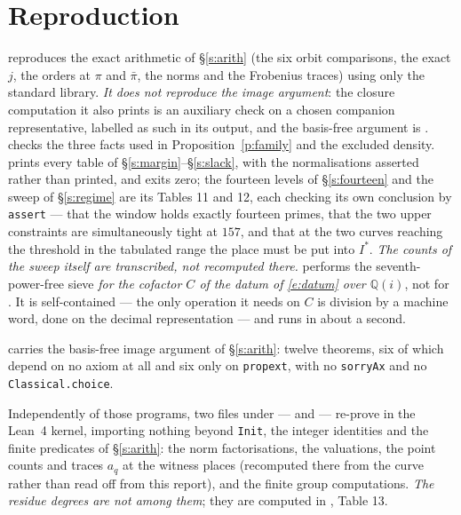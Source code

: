 \documentclass[11pt]{article}
\theoremstyle{plain}
\theoremstyle{definition}
\begin{document}
\section{Reproduction}\label{s:repro}

 reproduces the exact arithmetic of \S\ref{s:arith}
(the six orbit comparisons, the exact $j$, the orders at $\pi$ and $\bar\pi$, the
norms and the Frobenius traces) using only the standard library.  \emph{It does not
reproduce the image argument}: the closure computation it also prints is an auxiliary
check on a chosen companion representative, labelled as such in its output, and the
basis-free argument is .   checks the three facts used in
Proposition~\ref{p:family} and the excluded density.
 prints every table of
\S\ref{s:margin}--\S\ref{s:slack}, with the normalisations asserted rather than
printed, and exits zero; the fourteen levels of \S\ref{s:fourteen} and the sweep of
\S\ref{s:regime} are its Tables 11 and 12, each checking its own conclusion by
\texttt{assert} --- that the window holds exactly fourteen primes, that the two upper
constraints are simultaneously tight at $157$, and that at the two curves reaching the
threshold in the tabulated range the place must be put into $I^{*}$.  \emph{The counts
of the sweep itself are transcribed, not recomputed there.}   performs the seventh-power-free sieve
\emph{for the cofactor $C$ of the datum of \eqref{e:datum} over $\mathbb{Q}(i)$}, not
for \cite{First}.  It is
self-contained --- the only operation it needs on $C$ is division by a machine word,
done on the decimal representation --- and runs in about a second.

 carries the basis-free image argument of
\S\ref{s:arith}: twelve theorems, six of which depend on no axiom at all and six only
on \texttt{propext}, with no \texttt{sorryAx} and no \texttt{Classical.choice}.

Independently of those programs, two files under  ---
 and  --- re-prove in the
Lean~4 kernel, importing nothing beyond \texttt{Init}, the integer identities and the
finite predicates of \S\ref{s:arith}: the norm factorisations, the valuations, the
point counts and traces $a_q$ at the witness places (recomputed there from the curve
rather than read off from this report), and the finite group computations.  \emph{The residue degrees are
not among them}; they are computed in , Table 13.
\end{document}
